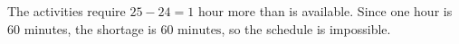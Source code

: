 The activities require $25-24=1$ hour more than is available. Since one hour is 60 minutes, the shortage is $\boxed{60\text{ minutes}}$, so the schedule is impossible.
